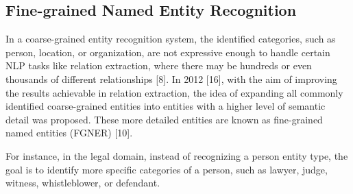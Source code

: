 \subsection{Fine-grained Named Entity Recognition}

In a coarse-grained entity recognition system, the identified categories, such as person, location, or organization, are not expressive enough to handle certain NLP tasks like relation extraction, where there may be hundreds or even thousands of different relationships [8]. In 2012 [16], with the aim of improving the results achievable in relation extraction, the idea of expanding all commonly identified coarse-grained entities into entities with a higher level of semantic detail was proposed. These more detailed entities are known as fine-grained named entities (FGNER) [10].

For instance, in the legal domain, instead of recognizing a person entity type, the goal is to identify more specific categories of a person, such as lawyer, judge, witness, whistleblower, or defendant.

